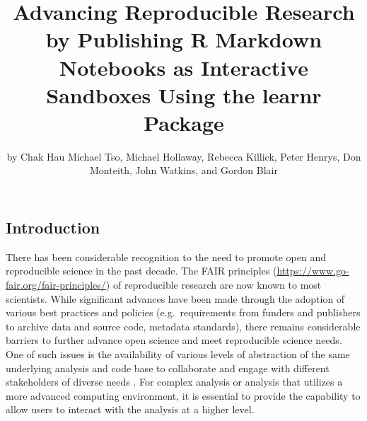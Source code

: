 \title{Advancing Reproducible Research by Publishing R Markdown
Notebooks as Interactive Sandboxes Using the learnr Package}
\author{by Chak Hau Michael Tso, Michael Hollaway, Rebecca
Killick, Peter Henrys, Don Monteith, John Watkins, and Gordon Blair}

\maketitle


\hypertarget{introduction}{%
\subsection{Introduction}\label{introduction}}

There has been considerable recognition to the need to promote open and
reproducible science in the past decade. The FAIR principles
\citep{Wilkinson2016a, Stall2019}
(\url{https://www.go-fair.org/fair-principles/}) of reproducible
research are now known to most scientists. While significant advances
have been made through the adoption of various best practices and
policies (e.g.~requirements from funders and publishers to archive data
and source code, metadata standards), there remains considerable
barriers to further advance open science and meet reproducible science
needs. One of such issues is the availability of various levels of
abstraction of the same underlying analysis and code base to collaborate
and engage with different stakeholders of diverse needs
\citep{Blair2019, Hollaway2020}. For complex analysis or analysis that
utilizes a more advanced computing environment, it is essential to
provide the capability to allow users to interact with the analysis at a
higher level.

